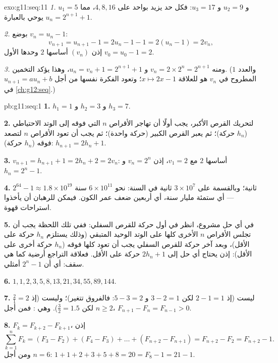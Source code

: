 \begin{solution}{exo:g11:seq:11}
\emph{1.} $u_1 = 5$ و $u_2 = 9$ و $u_3 = 17$: فكل حد يزيد بواحد على
$4, 8, 16$، مما يوحي بالعبارة $u_n = 2^{n+1} + 1$.

\emph{2.} بوضع $v_n = u_n - 1$:
\[
v_{n+1} = u_{n+1} - 1 = 2u_n - 1 - 1 = 2(u_n - 1) = 2v_n,
\]
إذن $(v_n)$  أساسها $2$ وحدها الأول
$v_0 = u_0 - 1 = 2$.

\emph{3.} ومنه $v_n = 2 \times 2^n = 2^{n+1}$ و
$u_n = v_n + 1 = 2^{n+1} + 1$، وهذا يؤكد التخمين. (والعدد $1$
المطروح في $v_n$ هو  للعلاقة $x \mapsto 2x - 1$؛ وتعود
الفكرة نفسها من أجل $u_{n+1} = au_n + b$ في \cref{ch:g12:seq}.)
\end{solution}

\begin{solution}{pb:g11:seq:1}
\textbf{1.} $h_1 = 1$ و $h_2 = 3$ و $h_3 = 7$.

\textbf{2.} لتحريك القرص الأكبر، يجب أولًا أن تهاجر الأقراص $n$
التي فوقه إلى الوتد الاحتياطي ($h_n$ حركة)؛ ثم يعبر القرص الكبير
(حركة واحدة)؛ ثم يجب أن تعود الأقراص $n$ لتصعد فوقه
($h_n$ حركة): $h_{n+1} = 2h_n + 1$.

\textbf{3.} $v_{n+1} = h_{n+1} + 1 = 2h_n + 2 = 2v_n$:
 أساسها $2$ مع $v_1 = 2$، إذن $v_n = 2^n$ و
$h_n = 2^n - 1$.

\textbf{4.} $2^{64} - 1 \approx 1.8 \times 10^{19}$ ثانية؛
وبالقسمة على $3 \times 10^7$ ثانية في السنة:
نحو $6 \times 10^{11}$ سنة --- أي ستمئة مليار سنة،
أي أربعين ضعف عمر الكون. فيمكن للرهبان أن يأخذوا
استراحات قهوة.

\textbf{5.} في أي حل مشروع، انظر في أول حركة للقرص
السفلي: ففي تلك اللحظة يجب أن تجلس الأقراص $n$ الأخرى كلها على
الوتد الوحيد المتبقي (وذلك يستلزم $h_n$ حركة على الأقل)،
وبعد آخر حركة للقرص السفلي يجب أن تعود كلها فوقه
($h_n$ حركة أخرى على الأقل): إذن يحتاج أي حل إلى
$2h_n + 1$ حركة على الأقل. فعلاقة التراجع أرضية كما هي
سقف: أي أن $2^n - 1$ أمثلي.

\textbf{6.} $1, 1, 2, 3, 5, 8, 13, 21, 34, 55, 89, 144$.

\textbf{7.} ليست  (إذ $2 - 1 = 1$ لكن $3 - 2 = 1$ و
$5 - 3 = 2$: فالفروق تتغير)؛ وليست 
(إذ $\frac21 = 2$ لكن $\frac32 = 1.5$). وهي : فمن أجل
$n \geq 2$، $F_{n+1} - F_n = F_{n-1} > 0$.

\textbf{8.} $F_k = F_{k+2} - F_{k+1}$، إذن
\[
\sum_{k=1}^{n} F_k = (F_3 - F_2) + (F_4 - F_3) + \dots +
(F_{n+2} - F_{n+1}) = F_{n+2} - F_2 = F_{n+2} - 1 .
\]
ومن أجل $n = 6$: $1 + 1 + 2 + 3 + 5 + 8 = 20 = F_8 - 1 = 21 - 1$.


\end{solution}
